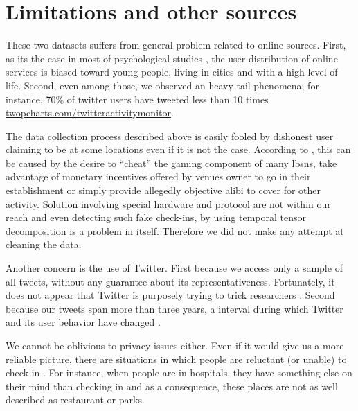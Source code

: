 \section{Limitations and other sources}
\label{sec:limitations}

These two datasets suffers from general problem related to online sources.
First, as its the case in most of psychological studies \autocite{Weird10}, the
user distribution of online services is biased toward young people, living in
cities and with a high level of life. Second, even among those, we observed an
heavy tail phenomena; for instance, 70\% of twitter users have tweeted less
than 10 times \href{http://twopcharts.com/twitteractivitymonitor}%
{\url{twopcharts.com/twitteractivitymonitor}}.


The data collection process described above is easily fooled by dishonest user
claiming to be at some locations even if it is not the case. According to
\autocite{FakeCheckins12}, this can be caused by the desire to \enquote{cheat}
the gaming component of many \glspl{lbsn}, take advantage of monetary
incentives offered by venues owner to go in their establishment or simply
provide allegedly objective alibi to cover for other activity. Solution
involving special hardware and protocol are not within our reach
\autocite{ValidateCheckin13} and even detecting such fake check-ins, by using
temporal tensor decomposition \autocite{FindingFake14} is a problem in itself.
Therefore we did not make any attempt at cleaning the data.

Another concern is the use of Twitter. First because we access only a sample
of all tweets, without any guarantee about its representativeness.
Fortunately, it does not appear that Twitter is purposely trying to trick
researchers \autocite{TwitterBias14}. Second because our tweets span more than
three years, a interval during which Twitter and its user behavior have
changed \autocite{TwitterEvolution14}.

We cannot be oblivious to privacy issues either.
Even if it would give us a more reliable picture, there are situations in
which people are reluctant (or unable) to check-in \autocite{Privacy11}. For
instance, when people are in hospitals, they have something else on their mind
than checking in and as a consequence, these places are not as well described
as restaurant or parks.

